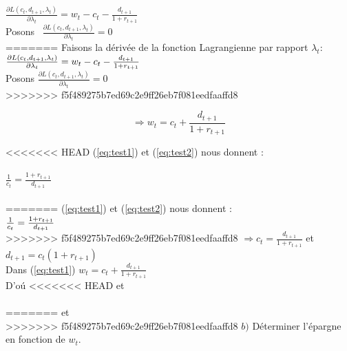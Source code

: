 \documentclass[11pt,twoside,a4paper]{article}
\begin{document}
$
\frac{\partial L(c_t,d_{t+1},\lambda_t)}{\partial \lambda_t} = w_t-c_t - \frac{d_{t+1}}{1+r_{t+1}} 
$ \\

Posons \ $ \frac{\partial L(c_t,d_{t+1},\lambda_t)}{\partial \lambda_t} = 0 $ \\
=======
Faisons la dérivée de la fonction Lagrangienne par rapport $\lambda_t :  $ \\
$\\
\frac{\partial L(c_t,d_{t+1},\lambda_t)}{\partial \lambda_t} = w_t-c_t - \frac{d_{t+1}}{1+r_{t+1}} 
$ \\

Posons  $ \frac{\partial L(c_t,d_{t+1},\lambda_t)}{\partial \lambda_t} = 0 $ \\
>>>>>>> f5f489275b7ed69c2e9ff26eb7f081eedfaaffd8

 \begin{equation}\label{eq:test3}
  \Rightarrow w_t=c_t + \frac{d_{t+1}}{1+r_{t+1}}
\end{equation}
    

<<<<<<< HEAD
(\ref{eq:test1}) et (\ref{eq:test2}) nous donnent : \\ \\

$
\frac{1}{c_t} = \frac{1+r_{t+1}}{d_{t+1}}
$\\ \\

=======
(\ref{eq:test1}) et (\ref{eq:test2}) nous donnent : \\
$\\
\frac{1}{c_t} = \frac{1+r_{t+1}}{d_{t+1}}\\
$\\
>>>>>>> f5f489275b7ed69c2e9ff26eb7f081eedfaaffd8
$ \Rightarrow c_t= \frac{d_{t+1}}{1+r_{t+1}}$  et  $ d_{t+1}= c_t ({1+r_{t+1}})$\\

Dans (\ref{eq:test1})\: $ w_t=c_t + \frac{d_{t+1}}{1+r_{t+1}}$ \\

D'o\'{u} \:
<<<<<<< HEAD
  \: et \: \\ \\
=======
  \: et \: \\
 
 
>>>>>>> f5f489275b7ed69c2e9ff26eb7f081eedfaaffd8
 $b)$  Déterminer l'épargne en fonction de $w_t$.\\
 
\end{document}
